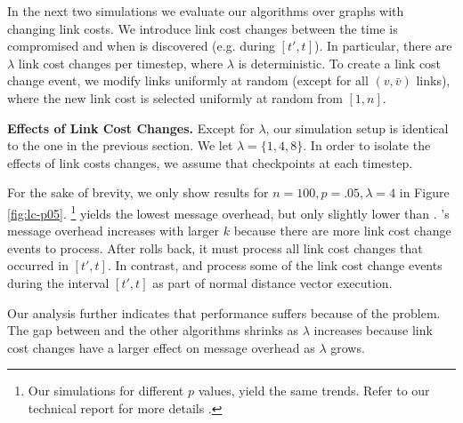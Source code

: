 In the next two simulations we evaluate our algorithms over graphs with changing link costs. We introduce link cost changes between the time \bad is compromised and when \bad is discovered 
(e.g. during $[t',t]$). 
In particular, there are $\lambda$ link cost changes per timestep, where $\lambda$ is deterministic. 
To create a link cost change event, we modify links uniformly at random (except for all $(v,\bar{v})$ links), where the new link cost is selected uniformly at random from $[1,n]$. 



{\bf Effects of Link Cost Changes.}
Except for $\lambda$, our simulation setup is identical to the one in the previous section. We let $\lambda = \{1,4,8\}$. In order to isolate the effects of link costs changes,
we assume that \cpr checkpoints at each timestep.

For the sake of brevity, we only show results for $n=100,p=.05, \lambda=4$ in Figure \ref{fig:lc-p05}.  
{\footnote {\small Our simulations for different $p$ values, yield the same trends.  Refer to our technical report for more details \cite{Tech}.}}
\purge yields the lowest message overhead, but only slightly lower than \cprs. 
\cprs's message overhead increases with larger $k$ because there are more link cost change events to process. After \cpr rolls back, it must process all link cost
changes that occurred in $[t',t]$. 
In contrast, \second and \purge process some of the link cost change events during the interval $[t',t]$ as part of normal distance vector execution. 

Our analysis further indicates that \second performance suffers because of the \infinity problem. 
The gap between \second and the other algorithms shrinks as $\lambda$ increases because link cost changes have a larger effect on message overhead as $\lambda$ grows.




